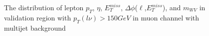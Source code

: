 \begin{figure}[ht]
	\caption{The distribution of lepton $p_{T}$, $\eta$, $E_{T}^{miss}$, $\Delta\phi$($\ell$,$E_{T}^{miss}$), and $m_{WV}$ in validation region with $p_{T}(l\nu)>150 GeV$ in muon channel with multijet background}
	\label{fig:FakeVR1_mu}
\end{figure}

